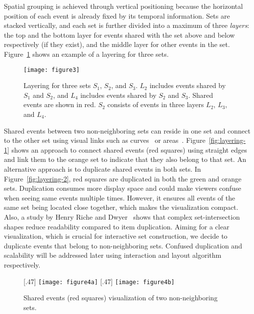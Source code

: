 Spatial grouping is achieved through vertical positioning because the horizontal position of each event is already fixed by its temporal information. Sets are stacked vertically, and each set is further divided into a maximum of three \emph{layers}: the top and the bottom layer for events shared with the set above and below respectively (if they exist), and the middle layer for other events in the set. Figure~\ref{fig:layering} shows an example of a layering for three sets.

\begin{figure}[!htb]
\centering
\texttt{[image: figure3]}
\caption{Layering for three sets $S_1$, $S_2$, and $S_3$. $L_2$ includes events shared by $S_1$ and $S_2$, and $L_4$ includes events shared by $S_2$ and $S_3$. Shared events are shown in red. $S_2$ consists of events in three layers $L_2$, $L_3$, and $L_4$.}
\label{fig:layering}
\end{figure}

Shared events between two non-neighboring sets can reside in one set and connect to the other set using visual links such as curves~\cite{Alper2011} or areas~\cite{Meulemans2013}. Figure~\ref{fig:layering-1} shows an approach to connect shared events (red squares) using straight edges and link them to the orange set to indicate that they also belong to that set. An alternative approach is to duplicate shared events in both sets. In Figure~\ref{fig:layering-2}, red squares are duplicated in both the green and orange sets. Duplication consumes more display space and could make viewers confuse when seeing same events multiple times. However, it ensures all events of the same set being located close together, which makes the visualization compact. Also, a study by Henry Riche and Dwyer~\cite{Riche2010} shows that complex set-intersection shapes reduce readability compared to item duplication. Aiming for a clear visualization, which is crucial for interactive set construction, we decide to duplicate events that belong to non-neighboring sets. Confused duplication and scalability will be addressed later using interaction and layout algorithm respectively.

\begin{figure}[!htb]
	\centering
	[.47\columnwidth]
	{\texttt{[image: figure4a]}}
	\hfill	
	[.47\columnwidth]
	{\texttt{[image: figure4b]}}
	\caption{Shared events (red squares) visualization of two non-neighboring sets.}
	\label{fig:layering-compare}
\end{figure}

